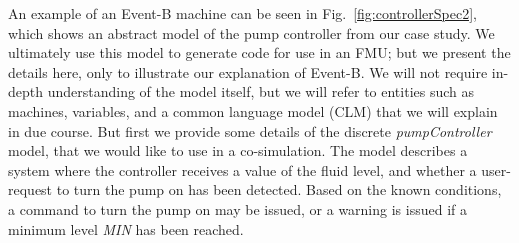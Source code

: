\documentclass{llncs}%
\begin{document}
An example of an Event-B machine can be seen in Fig.~\ref{fig:controllerSpec2}, which shows an abstract model of the pump controller from our case study. We ultimately use this model to generate code for use in an FMU; but we present the details here, only to illustrate our explanation of Event-B. We will not require in-depth understanding of the model itself, but we will refer to entities such as machines, variables, and a common language model (CLM) that we will explain in due course.  But first we provide some details of the discrete \emph{pumpController} model, that we would like to use in a co-simulation. The model describes a system where the controller receives a value of the fluid level, and whether a user-request to turn the pump on has been detected. Based on the known conditions, a command to turn the pump on may be issued, or a warning is issued if a minimum level \emph{MIN} has been reached.    
%
%
\end{document}
